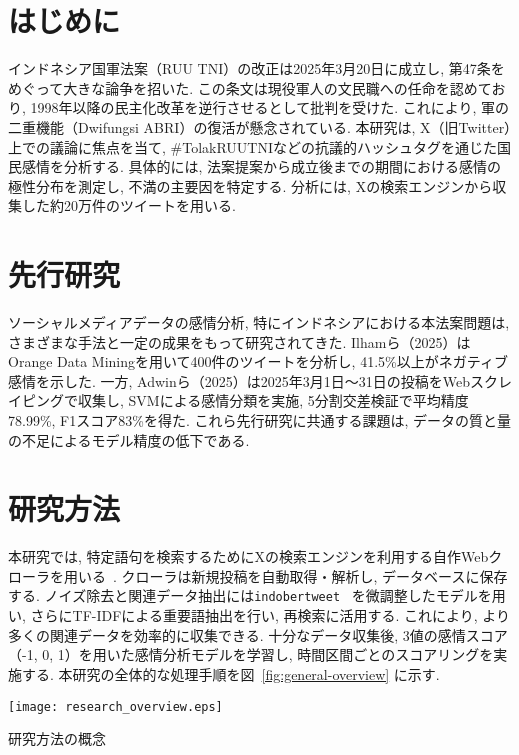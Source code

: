 \documentclass{jabstract}
\begin{document}
\maketitle

\begin{multicols}{2}
\section{はじめに}
インドネシア国軍法案（RUU TNI）の改正は2025年3月20日に成立し, 第47条をめぐって大きな論争を招いた. この条文は現役軍人の文民職への任命を認めており, 1998年以降の民主化改革を逆行させるとして批判を受けた. これにより, 軍の二重機能（Dwifungsi ABRI）の復活が懸念されている\cite{HRW2024}. 
本研究は, X（旧Twitter）上での議論に焦点を当て, \#TolakRUUTNIなどの抗議的ハッシュタグを通じた国民感情を分析する. 具体的には, 法案提案から成立後までの期間における感情の極性分布を測定し, 不満の主要因を特定する. 分析には, Xの検索エンジンから収集した約20万件のツイートを用いる. 
\section{先行研究}
ソーシャルメディアデータの感情分析, 特にインドネシアにおける本法案問題は, さまざまな手法と一定の成果をもって研究されてきた. Ilhamら（2025）はOrange Data Miningを用いて400件のツイートを分析し, 41.5\%以上がネガティブ感情を示した\cite{Ilham2025}. 一方, Adwinら（2025）は2025年3月1日～31日の投稿をWebスクレイピングで収集し, SVMによる感情分類を実施, 5分割交差検証で平均精度78.99\%, F1スコア83\%を得た\cite{Nurhasananda_Akbar_2025}. これら先行研究に共通する課題は, データの質と量の不足によるモデル精度の低下である. 
\section{研究方法}
本研究では, 特定語句を検索するためにXの検索エンジンを利用する自作Webクローラを用いる~\cite{twitter_search_operators}. クローラは新規投稿を自動取得・解析し, データベースに保存する. ノイズ除去と関連データ抽出には\texttt{indobertweet}~\cite{koto2021indobertweet} を微調整したモデルを用い, さらにTF-IDFによる重要語抽出を行い, 再検索に活用する. これにより, より多くの関連データを効率的に収集できる. 
十分なデータ収集後, 3値の感情スコア（-1, 0, 1）を用いた感情分析モデルを学習し, 時間区間ごとのスコアリングを実施する. 本研究の全体的な処理手順を図~\ref{fig:general-overview} に示す. 

\begin{figurehere}
  \centering
    \texttt{[image: research\_overview.eps]}
    \caption{研究方法の概念}\label{fig:general-overview}
\end{figurehere}


\end{multicols}
\end{document}
